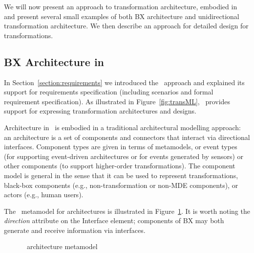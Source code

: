 We will now present an approach to transformation architecture, embodied in \transml\, and present several small examples of both BX architecture and unidirectional transformation architecture. We then describe an approach for detailed design for transformations.

\subsection{BX Architecture in \transml\ }
In Section~\ref{section:requirements} we introduced the \transml\ approach and explained its support for requirements specification (including scenarios and formal requirement specification). As illustrated  in Figure~\ref{fig:transML}, \transml\ provides support for expressing transformation architectures and designs. 

Architecture in \transml\ is embodied in a traditional architectural modelling approach: an architecture is a set of components and connectors that interact via directional interfaces. Component types are given in terms of metamodels, or event types (for supporting event-driven architectures or for events generated by sensors) or other components (to support higher-order transformations). The component model is general in the sense that it can be used to represent transformations, black-box components (e.g., non-transformation or non-MDE components), or actors (e.g., human users). 

The \transml\ metamodel for architectures is illustrated in Figure~\ref{fig:transml-architecture}. It is worth noting the \textit{direction} attribute on the Interface element; components of BX may both generate and receive  information via interfaces.

\begin{figure}[htbp]
\caption{\transml\ architecture metamodel}
\label{fig:transml-architecture}
\end{figure}

